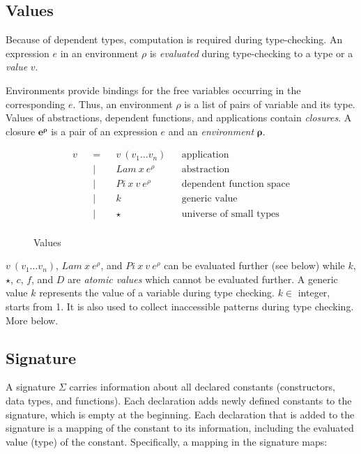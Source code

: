 \documentclass[acmsmall]{acmart}
\begin{document}
\subsection{Values}

Because of dependent types, computation is required during type-checking. An
expression $e$ in an environment $\rho$ is \emph{evaluated} during type-checking to a type or a \emph{value} $v$.

Environments provide bindings for the free variables occurring in the
corresponding $e$. Thus, an environment $\rho$ is a list of pairs of variable and its type. Values of abstractions, dependent functions, and applications contain \emph{closures}. A closure $\boldsymbol{e^{\rho}}$ is a pair of an expression $e$ and an
\emph{environment} $\boldsymbol{\rho}$.

\begin{figure}[H]
  \begin{equation*}
    \label{eq:values}
    \begin{aligned}
      v &  & = &  & v \: (v_1 \dots v_n)     &  & \textrm{application}              \\
        &  & | &  & Lam \: x \: e^{\rho}     &  & \textrm{abstraction}              \\
        &  & | &  & Pi \: x \: v \: e^{\rho} &  & \textrm{dependent function space} \\
        &  & | &  & k                        &  & \textrm{generic value}            \\
        &  & | &  & \star                    &  & \textrm{universe of small types}  \\
    \end{aligned}
  \end{equation*}
  \caption{Values}
\end{figure}

$v \: (v_1 \dots v_n)$, $Lam \: x \: e^{\rho}$, and $Pi \: x \: v \: e^{\rho}$
can be evaluated further (see below) while $k$, $\star$, $c$, $f$, and $D$ are \emph{atomic values}
which cannot be evaluated further. A generic value $k$ represents the value of a variable during type
checking. $k \in$ integer, starts from 1. It is also used to collect inaccessible patterns during type checking. More below. 

\subsection{Signature}
A signature $\Sigma$ carries information about all declared constants (constructors, data types, and functions). Each declaration adds newly defined constants to the signature, which is empty at the beginning. Each declaration that is added to the signature is a mapping of the constant to its information, including the evaluated value (type) of the constant. Specifically, a mapping in the signature maps:
\end{document}
